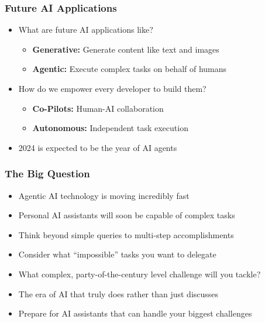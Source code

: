 \begin{frame}[fragile]\frametitle{Future AI Applications}
\begin{itemize}
    \item What are future AI applications like?
    \begin{itemize}
        \item \textbf{Generative:} Generate content like text and images
        \item \textbf{Agentic:} Execute complex tasks on behalf of humans
    \end{itemize}
    \item How do we empower every developer to build them?
    \begin{itemize}
        \item \textbf{Co-Pilots:} Human-AI collaboration
        \item \textbf{Autonomous:} Independent task execution
    \end{itemize}
    \item 2024 is expected to be the year of AI agents
\end{itemize}
\end{frame}

\begin{frame}[fragile]\frametitle{The Big Question}
      \begin{itemize}
        \item Agentic AI technology is moving incredibly fast
        \item Personal AI assistants will soon be capable of complex tasks
        \item Think beyond simple queries to multi-step accomplishments
        \item Consider what ``impossible'' tasks you want to delegate
        \item What complex, party-of-the-century level challenge will you tackle?
        \item The era of AI that truly does rather than just discusses
        \item Prepare for AI assistants that can handle your biggest challenges
      \end{itemize}
\end{frame}


